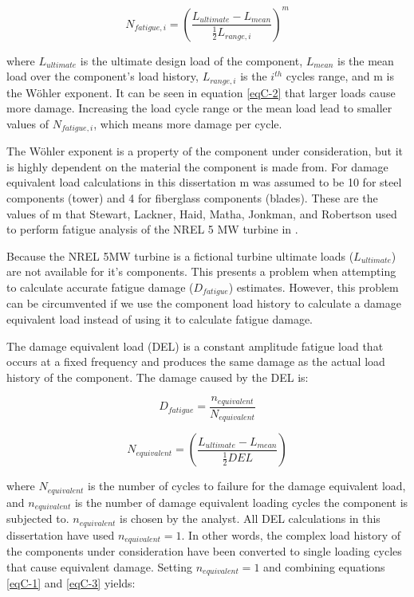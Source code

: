 \begin{equation}
N_{fatigue, i} = \left ( \frac{L_{ultimate}-L_{mean}}{\frac{1}{2}L_{range,i}} \right )^m \label{eqC-2}
\end{equation}

where $L_{ultimate}$ is the ultimate design load of the component, $L_{mean}$ is the mean load over the component's load history, $L_{range,i}$ is the $i^{th}$ cycles range, and m is the W\"{o}hler exponent. It can be seen in equation \ref{eqC-2} that larger loads cause more damage. Increasing the load cycle range or the mean load lead to smaller values of $N_{fatigue, i}$, which means more damage per cycle.  

The W\"{o}hler exponent is a property of the component under consideration, but it is highly dependent on the material the component is made from. For damage equivalent load calculations in this dissertation m was assumed to be 10 for steel components (tower) and 4 for fiberglass components (blades). These are the values of m that Stewart, Lackner, Haid, Matha, Jonkman, and Robertson used to perform fatigue analysis of the NREL 5 MW turbine in \cite{stewart2013}.

Because the NREL 5MW turbine is a fictional turbine ultimate loads ($L_{ultimate}$) are not available for it's components. This presents a problem when attempting to calculate accurate fatigue damage ($D_{fatigue}$) estimates. However, this problem can be circumvented if we use the component load history to calculate a damage equivalent load instead of using it to calculate fatigue damage. 

The damage equivalent load (DEL) is a constant amplitude fatigue load that occurs at a fixed frequency and produces the same damage as the actual load history of the component. The damage caused by the DEL is:

\begin{equation}
D_{fatigue} =  \frac{n_{equivalent}}{N_{equivalent}} \label{eqC-3}
\end{equation}

\begin{equation}
N_{equivalent} = \left ( \frac{L_{ultimate}-L_{mean}}{\frac{1}{2}DEL} \right ) \label{eqC-4}
\end{equation}

where $N_{equivalent}$ is the number of cycles to failure for the damage equivalent load, and $n_{equivalent}$ is the number of damage equivalent loading cycles the component is subjected to. $n_{equivalent}$ is chosen by the analyst. All DEL calculations in this dissertation have used $n_{equivalent} = 1$. In other words, the complex load history of the components under consideration have been converted to single loading cycles that cause equivalent damage. Setting $n_{equivalent} = 1$ and combining equations \ref{eqC-1} and \ref{eqC-3} yields:

